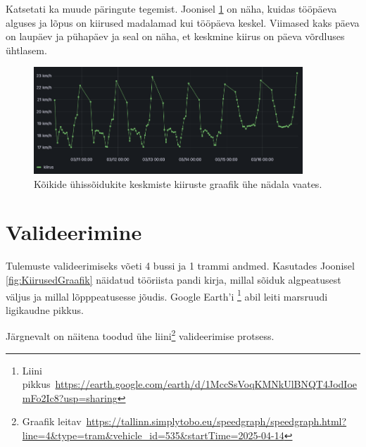 Katsetati ka muude päringute tegemist. Joonisel \ref{fig:nadalaKeskmine} on näha, kuidas tööpäeva alguses ja lõpus on kiirused madalamad kui tööpäeva keskel. Viimased kaks päeva on laupäev ja pühapäev ja seal on näha, et keskmine kiirus on päeva võrdluses ühtlasem. 
\begin{figure}[H]
    \centering
    \includegraphics[width=0.9\textwidth]{figures/Kiirused5toopaeva2puhke.png}
    \caption{Kõikide ühissõidukite keskmiste kiiruste graafik ühe nädala vaates.}
    \label{fig:nadalaKeskmine}
\end{figure}





\section{Valideerimine}\label{section:valideerimine}

Tulemuste valideerimiseks võeti 4 bussi ja 1 trammi andmed. Kasutades Joonisel \ref{fig:KiirusedGraafik} näidatud tööriista pandi kirja, millal sõiduk algpeatusest väljus ja millal lõpppeatusesse jõudis. Google Earth'i \footnote{Liini pikkus~\url{https://earth.google.com/earth/d/1MccSsVoqKMNkUlBNQT4JodIoemFo2Ic8?usp=sharing}} abil leiti marsruudi ligikaudne pikkus.

Järgnevalt on näitena toodud ühe liini\footnote{Graafik leitav~\url{https://tallinn.simplytobo.eu/speedgraph/speedgraph.html?line=4&type=tram&vehicle_id=535&startTime=2025-04-14}} valideerimise protsess. 

